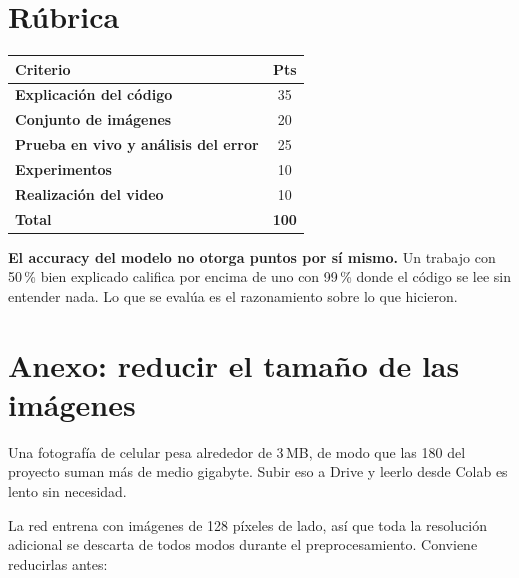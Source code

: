 \documentclass[11pt,a4paper]{article}
\begin{document}
\section{Rúbrica}

\begin{center}
	\renewcommand{\arraystretch}{1.5}
\begin{tabular}{L{10cm} c}
\toprule
\textbf{Criterio} & \textbf{Pts}  \\
\midrule

\textbf{Explicación del código} & 35 \\

\textbf{Conjunto de imágenes} & 20 \\

\textbf{Prueba en vivo y análisis del error}
& 25 \\

\textbf{Experimentos}
& 10 \\

\textbf{Realización del video}
& 10 \\

\midrule
\textbf{Total} & \textbf{100}  \\
\bottomrule
\end{tabular}
\end{center}

\begin{tcolorbox}[colback=black!4,colframe=black!45,boxrule=0.6pt]
\textbf{El accuracy del modelo no otorga puntos por sí mismo.} Un trabajo con 50\,\% bien explicado califica por encima de uno con 99\,\% donde el código se lee sin entender nada. Lo que se evalúa es el razonamiento sobre lo que hicieron.
\end{tcolorbox}

\newpage 

\section*{Anexo: reducir el tamaño de las imágenes}

Una fotografía de celular pesa alrededor de 3\,MB, de modo que las 180 del proyecto suman más de medio gigabyte. Subir eso a Drive y leerlo desde Colab es lento sin necesidad.

La red entrena con imágenes de 128 píxeles de lado, así que toda la resolución adicional se descarta de todos modos durante el preprocesamiento. Conviene reducirlas antes:
\end{document}
